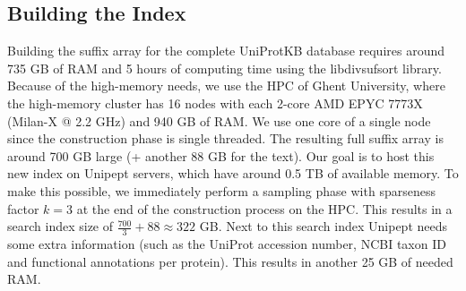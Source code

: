 \documentclass[11pt]{article}
\newenvironment{Figure}
{\par\medskip\noindent\minipage{\linewidth}}
{\endminipage\par\medskip}
\begin{document}
\begin{multicols}{2}
        \subsection{Building the Index}
        Building the suffix array for the complete UniProtKB database requires around 735 GB of RAM and 5 hours of computing time using the libdivsufsort library.
        Because of the high-memory needs, we use the HPC of Ghent University, where the high-memory cluster has 16 nodes with each 2-core AMD EPYC 7773X (Milan-X @ 2.2 GHz) and 940 GB of RAM\@.
        We use one core of a single node since the construction phase is single threaded.
        The resulting full suffix array is around 700 GB large (+ another 88 GB for the text).
        Our goal is to host this new index on Unipept servers, which have around 0.5 TB of available memory.
        To make this possible, we immediately perform a sampling phase with sparseness factor $k = 3$ at the end of the construction process on the HPC\@.
        This results in a search index size of $\frac{700}{3} + 88 \approx 322$ GB\@.
        Next to this search index Unipept needs some extra information (such as the UniProt accession number, NCBI taxon ID and functional annotations per protein).
        This results in another 25 GB of needed RAM\@.

        \begin{Figure}
            \centering
            \label{fig:uniprot_memory_treemap}
        \end{Figure}


\end{multicols}
\end{document}
